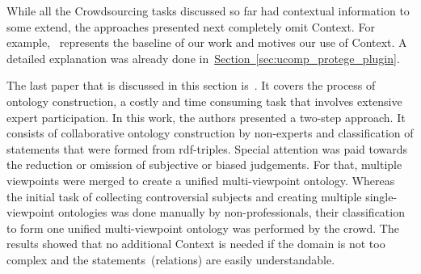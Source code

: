 While all the Crowdsourcing tasks discussed so far had contextual information to some extend, the approaches presented next completely omit Context. 
For example,~\cite{wohlgenannt2016} represents the baseline of our work and motives our use of Context. A detailed explanation was already done in~\hyperref[sec:ucomp_protege_plugin]{Section~\ref*{sec:ucomp_protege_plugin}}.

The last paper that is discussed in this section is~\cite{zhitomirsky2017}. It covers the process of ontology construction, a costly and time consuming task that involves extensive expert participation. In this work, the authors presented a two-step approach. It consists of collaborative ontology construction by non-experts and classification of statements that were formed from \gls{rdf}-triples. Special attention was paid towards the reduction or omission of subjective or biased judgements. For that, multiple viewpoints were merged to create a unified multi-viewpoint ontology.
Whereas the initial task of collecting controversial subjects and creating multiple single-viewpoint ontologies was done manually by non-professionals, their classification to form one unified multi-viewpoint ontology was performed by the crowd. 
The results showed that no additional Context is needed if the domain is not too complex and the statements~(relations) are easily understandable.  


